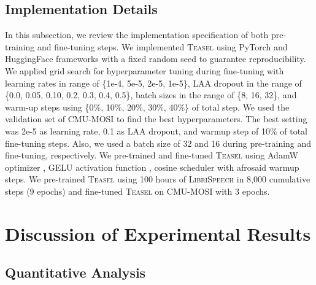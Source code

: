 \documentclass[letterpaper]{article} \usepackage{spconf,amsmath,graphicx}
\newcommand{\teasel}{\textsc{Teasel }}
\begin{document}
\subsection{Implementation Details}
In this subsection, we review the implementation specification of both pre-training and fine-tuning steps.  We implemented \teasel using PyTorch \cite{paszke2019pytorch} and HuggingFace frameworks \cite{wolf2019huggingface} with a fixed random seed to guarantee reproducibility. We applied grid search for hyperparameter tuning during fine-tuning with learning rates in range of \{1e-4, 5e-5, 2e-5, 1e-5\}, LAA dropout in the range of \{0.0, 0.05, 0.10, 0.2, 0.3, 0.4, 0.5\}, batch sizes in the range of \{8, 16, 32\}, and warm-up steps using \{0\%, 10\%, 20\%, 30\%, 40\%\} of total step. We used the validation set of CMU-MOSI to find the best hyperparameters. The best setting was 2e-5 as learning rate, 0.1 as LAA dropout, and warmup step of 10\% of total fine-tuning steps. Also, we used a batch size of 32 and 16 during pre-training and fine-tuning, respectively. We pre-trained and fine-tuned \teasel using AdamW optimizer \cite{loshchilov2017decoupled} , GELU activation function \cite{hendrycks2016gaussian}, cosine scheduler with afrosaid warmup steps. We pre-trained \teasel using 100 hours of \textsc{LibriSpeech} in 8,000 cumulative steps ($9$ epochs) and fine-tuned \teasel on CMU-MOSI with $3$ epochs. 


















\section{Discussion of Experimental Results}
\label{sec:results}
\subsection{Quantitative Analysis}
\end{document}
